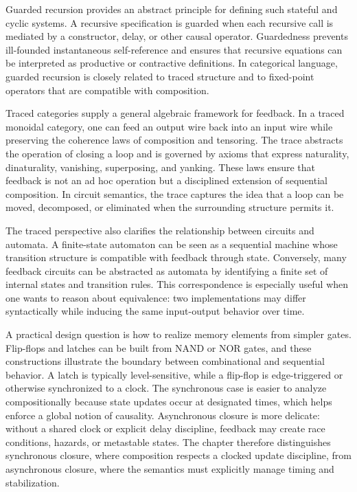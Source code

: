 \documentclass[11pt]{article}
\begin{document}
Guarded recursion provides an abstract principle for defining such stateful and cyclic systems. A recursive specification is guarded when each recursive call is mediated by a constructor, delay, or other causal operator. Guardedness prevents ill-founded instantaneous self-reference and ensures that recursive equations can be interpreted as productive or contractive definitions. In categorical language, guarded recursion is closely related to traced structure and to fixed-point operators that are compatible with composition.

Traced categories supply a general algebraic framework for feedback. In a traced monoidal category, one can feed an output wire back into an input wire while preserving the coherence laws of composition and tensoring. The trace abstracts the operation of closing a loop and is governed by axioms that express naturality, dinaturality, vanishing, superposing, and yanking. These laws ensure that feedback is not an ad hoc operation but a disciplined extension of sequential composition. In circuit semantics, the trace captures the idea that a loop can be moved, decomposed, or eliminated when the surrounding structure permits it.

The traced perspective also clarifies the relationship between circuits and automata. A finite-state automaton can be seen as a sequential machine whose transition structure is compatible with feedback through state. Conversely, many feedback circuits can be abstracted as automata by identifying a finite set of internal states and transition rules. This correspondence is especially useful when one wants to reason about equivalence: two implementations may differ syntactically while inducing the same input-output behavior over time.

A practical design question is how to realize memory elements from simpler gates. Flip-flops and latches can be built from NAND or NOR gates, and these constructions illustrate the boundary between combinational and sequential behavior. A latch is typically level-sensitive, while a flip-flop is edge-triggered or otherwise synchronized to a clock. The synchronous case is easier to analyze compositionally because state updates occur at designated times, which helps enforce a global notion of causality. Asynchronous closure is more delicate: without a shared clock or explicit delay discipline, feedback may create race conditions, hazards, or metastable states. The chapter therefore distinguishes synchronous closure, where composition respects a clocked update discipline, from asynchronous closure, where the semantics must explicitly manage timing and stabilization.
\end{document}
